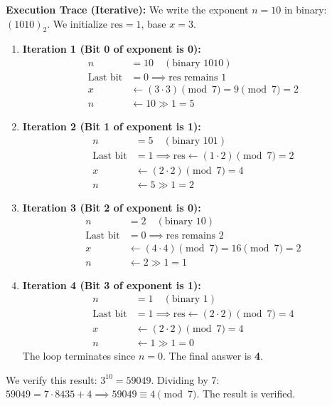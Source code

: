 \documentclass[10pt,journal,compsoc,onecolumn]{IEEEtran}
\begin{document}
\textbf{Execution Trace (Iterative):}
We write the exponent $n = 10$ in binary: $(1010)_2$. We initialize $\text{res} = 1$, base $x = 3$.
\begin{enumerate}
    \item \textbf{Iteration 1 (Bit 0 of exponent is 0):}
    \begin{align}
    n &= 10 \quad (\text{binary } 1010) \\
    \text{Last bit} &= 0 \implies \text{res remains } 1 \\
    x &\leftarrow (3 \cdot 3) \pmod 7 = 9 \pmod 7 = 2 \\
    n &\leftarrow 10 \gg 1 = 5
    \end{align}
    \item \textbf{Iteration 2 (Bit 1 of exponent is 1):}
    \begin{align}
    n &= 5 \quad (\text{binary } 101) \\
    \text{Last bit} &= 1 \implies \text{res} \leftarrow (1 \cdot 2) \pmod 7 = 2 \\
    x &\leftarrow (2 \cdot 2) \pmod 7 = 4 \\
    n &\leftarrow 5 \gg 1 = 2
    \end{align}
    \item \textbf{Iteration 3 (Bit 2 of exponent is 0):}
    \begin{align}
    n &= 2 \quad (\text{binary } 10) \\
    \text{Last bit} &= 0 \implies \text{res remains } 2 \\
    x &\leftarrow (4 \cdot 4) \pmod 7 = 16 \pmod 7 = 2 \\
    n &\leftarrow 2 \gg 1 = 1
    \end{align}
    \item \textbf{Iteration 4 (Bit 3 of exponent is 1):}
    \begin{align}
    n &= 1 \quad (\text{binary } 1) \\
    \text{Last bit} &= 1 \implies \text{res} \leftarrow (2 \cdot 2) \pmod 7 = 4 \\
    x &\leftarrow (2 \cdot 2) \pmod 7 = 4 \\
    n &\leftarrow 1 \gg 1 = 0
    \end{align}
    The loop terminates since $n = 0$. The final answer is \textbf{4}.
\end{enumerate}
We verify this result: $3^{10} = 59049$. Dividing by 7: $59049 = 7 \cdot 8435 + 4 \implies 59049 \equiv 4 \pmod 7$. The result is verified.
\end{document}
